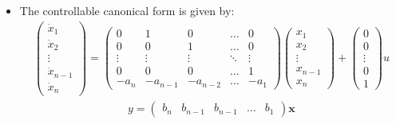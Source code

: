 \documentclass[12pt,a4paper]{article}
\begin{document}
\begin{itemize}
\item The controllable canonical form is given by:
\begin{gather*}
\begin{pmatrix}
\dot{x}_{1}\\
\dot{x}_{2}\\
\vdots\\
\dot{x}_{n-1}\\
\dot{x}_{n}
\end{pmatrix} =
\begin{pmatrix}
0 & 1 & 0 & \ldots & 0\\
0 & 0 & 1 & \ldots & 0 \\
\vdots &\vdots &\vdots  & \ddots & \vdots \\
0 & 0 & 0 & \ldots & 1\\
-a_{n} & -a_{n-1} & -a_{n-2} & \ldots & -a_{1}
\end{pmatrix} 
\begin{pmatrix}
{x}_{1}\\
{x}_{2}\\
\vdots\\
{x}_{n-1}\\
{x}_{n}
\end{pmatrix}
+
\begin{pmatrix}
0\\
0\\
\vdots\\
0\\
1
\end{pmatrix}u
\end{gather*}
\begin{gather*}
y = \begin{pmatrix}
b_{n}&b_{n-1}&b_{n-1}&\ldots&b_{1}
\end{pmatrix}
\mathbf{x}
\end{gather*}


\end{itemize}
\end{document}
